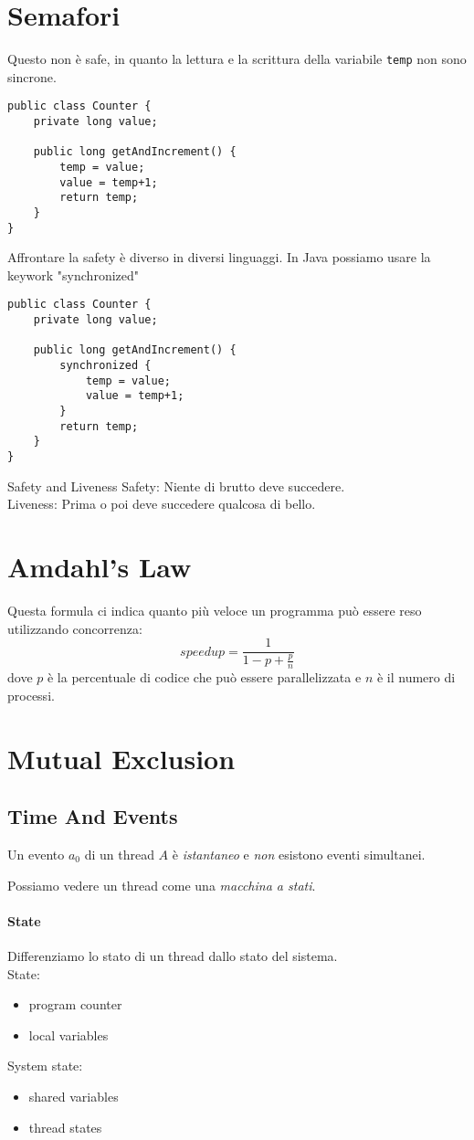 \documentclass{article}
\begin{document}
\section{Semafori}
Questo non è safe, in quanto la lettura e la scrittura della variabile \texttt{temp} non sono sincrone.
\begin{lstlisting}
public class Counter {
    private long value;

    public long getAndIncrement() {
        temp = value;
        value = temp+1;
        return temp;
    }
}
\end{lstlisting}

Affrontare la safety è diverso in diversi linguaggi. In Java possiamo usare la keywork "synchronized"
\begin{lstlisting}
public class Counter {
    private long value;

    public long getAndIncrement() {
        synchronized {
            temp = value;
            value = temp+1;
        }
        return temp;
    }
}
\end{lstlisting}

\begin{callout}{Safety and Liveness}
    Safety: Niente di brutto deve succedere. \\
    Liveness: Prima o poi deve succedere qualcosa di bello.
\end{callout}

\section{Amdahl's Law}
Questa formula ci indica quanto più veloce un programma può essere reso utilizzando concorrenza:
$$
speedup = \frac{1}{1-p+\frac p n}
$$
dove $p$ è la percentuale di codice che può essere parallelizzata e $n$ è il numero di processi.

\section{Mutual Exclusion}
\subsection{Time And Events}
Un evento $a_0$ di un thread $A$ è \textit{istantaneo} e \textit{non} esistono eventi simultanei.

Possiamo vedere un thread come una \textit{macchina a stati}.
\paragraph{State}
Differenziamo lo stato di un thread dallo stato del sistema. \\
State: \begin{itemize}
    \item program counter
    \item local variables
\end{itemize}
System state: \begin{itemize}
    \item shared variables
    \item thread states
\end{itemize}
\end{document}

